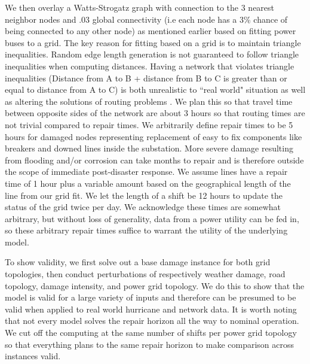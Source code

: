 We then overlay a Watts-Strogatz graph with connection to the 3 nearest neighbor nodes and .03 global connectivity (i.e each node has a 3\% chance of being connected to any other node) as mentioned earlier based on fitting power buses to a grid. The key reason for fitting based on a grid is to maintain triangle inequalities. Random edge length generation is not guaranteed to follow triangle inequalities when computing distances. Having a network that violates triangle inequalities (Distance from A to B + distance from B to C is greater than or equal to distance from A to C) is both unrealistic to ``real world" situation as well as altering the solutions of routing problems \cite{FlemingEA2013}. We plan this so that travel time between opposite sides of the network are about 3 hours so that routing times are not trivial compared to repair times. We arbitrarily define repair times to be 5 hours for damaged nodes representing replacement of easy to fix components like breakers and downed lines inside the substation. More severe damage resulting from flooding and/or corrosion can take months to repair and is therefore outside the scope of immediate post-disaster response. We assume lines have a repair time of 1 hour plus a variable amount based on the geographical length of the line from our grid fit. We let the length of a shift be 12 hours to update the status of the grid twice per day. We acknowledge these times are somewhat arbitrary, but without loss of generality, data from a power utility can be fed in, so these arbitrary repair times suffice to warrant the utility of the underlying model.

To show validity, we first solve out a base damage instance for both grid topologies, then conduct perturbations of respectively weather damage, road topology, damage intensity, and power grid topology. We do this to show that the model is valid for a large variety of inputs and therefore can be presumed to be valid when applied to real world hurricane and network data. It is worth noting that not every model solves the repair horizon all the way to nominal operation. We cut off the computing at the same number of shifts per power grid topology so that everything plans to the same repair horizon to make comparison across instances valid.

